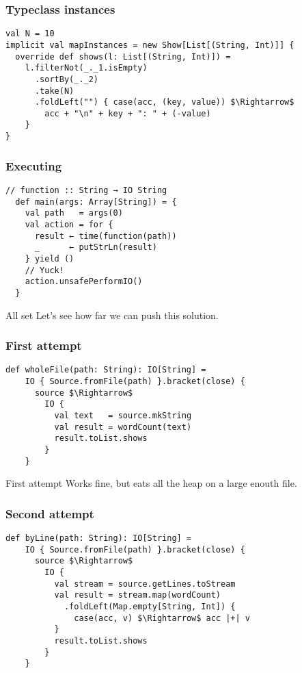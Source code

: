 \documentclass{beamer}
\begin{document}
\begin{frame}[fragile]
\frametitle{Typeclass instances}
\begin{lstlisting}[mathescape]
val N = 10
implicit val mapInstances = new Show[List[(String, Int)]] {
  override def shows(l: List[(String, Int)]) =
    l.filterNot(_._1.isEmpty)
      .sortBy(_._2)
      .take(N)
      .foldLeft("") { case(acc, (key, value)) $\Rightarrow$
        acc + "\n" + key + ": " + (-value)
    }
}
\end{lstlisting}
\end{frame}

\begin{frame}[fragile]
\frametitle{Executing}
\begin{lstlisting}[mathescape]
  // function :: String → IO String
  def main(args: Array[String]) = {
    val path   = args(0)
    val action = for {
      result ← time(function(path))
      _      ← putStrLn(result)
    } yield ()
    // Yuck!
    action.unsafePerformIO()
  }
\end{lstlisting}
\end{frame}

\begin{frame}{All set}
  Let's see how far we can push this solution.
\end{frame}

\begin{frame}[fragile]
\frametitle{First attempt}
\begin{lstlisting}[mathescape]
  def wholeFile(path: String): IO[String] =
    IO { Source.fromFile(path) }.bracket(close) {
      source $\Rightarrow$
        IO {
          val text   = source.mkString
          val result = wordCount(text)
          result.toList.shows
        }
    }
\end{lstlisting}
\end{frame}

\begin{frame}{First attempt}
  Works fine, but eats all the heap on a large enouth file.
\end{frame}

\begin{frame}[fragile]
\frametitle{Second attempt}
\begin{lstlisting}[mathescape]
  def byLine(path: String): IO[String] =
    IO { Source.fromFile(path) }.bracket(close) {
      source $\Rightarrow$
        IO {
          val stream = source.getLines.toStream
          val result = stream.map(wordCount)
            .foldLeft(Map.empty[String, Int]) {
              case(acc, v) $\Rightarrow$ acc |+| v
          }
          result.toList.shows
        }
    }
\end{lstlisting}
\end{frame}
\end{document}
